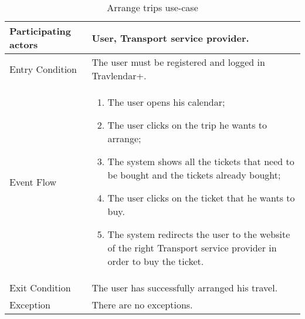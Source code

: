 \begin{table}[H]
	\begin{center}
		\begin{tabular}{ | p{} | p{} | }
		\hline
		Participating actors &  User, Transport service provider.\\
		\hline
		Entry Condition & The user must be registered and logged in Travlendar+.\\
		\hline
		Event Flow & 
			\begin{enumerate}
				\item The user opens his calendar;
				\item The user clicks on the trip he wants to arrange;
				\item The system shows all the tickets that need to be bought and the tickets already bought;
				\item The user clicks on the ticket that he wants to buy.
				\item The system redirects the user to the website of the right Transport service provider in order to buy the ticket.
			\end{enumerate} \\
		\hline
		Exit Condition & The user has successfully arranged his travel. \\
		\hline
		Exception & There are no exceptions. \\ 
		\hline
		\end{tabular}
	\end{center}
	\caption{Arrange trips use-case}
\end{table}